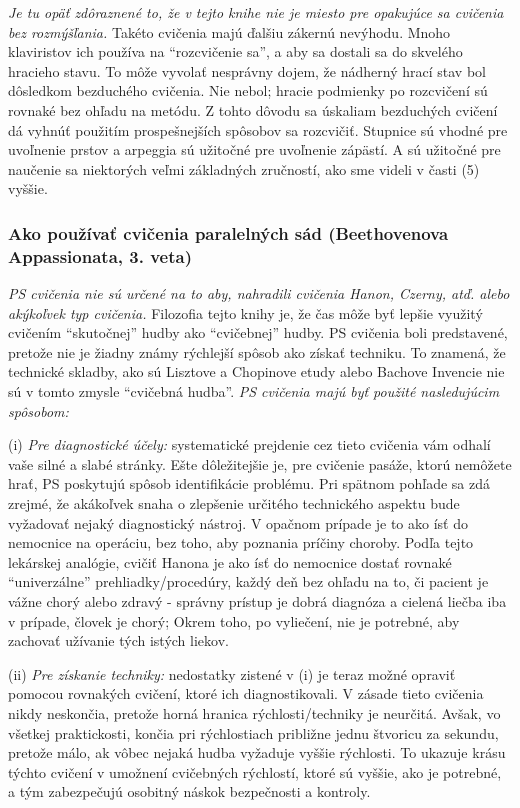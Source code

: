 \emph{Je tu opäť zdôraznené to, že v tejto knihe nie je miesto pre opakujúce sa cvičenia bez rozmýšľania.} Takéto cvičenia majú ďalšiu zákernú nevýhodu. Mnoho klaviristov ich používa na “rozcvičenie sa”, a aby sa dostali sa do skvelého hracieho stavu. To môže vyvolať nesprávny dojem, že nádherný hrací stav bol dôsledkom bezduchého cvičenia. Nie nebol; hracie podmienky po rozcvičení sú  rovnaké bez ohľadu na metódu. Z tohto dôvodu sa úskaliam bezduchých cvičení dá vyhnúť použitím prospešnejších spôsobov sa rozcvičiť. Stupnice sú vhodné pre uvoľnenie prstov a arpeggia sú užitočné pre uvoľnenie zápästí. A sú užitočné pre naučenie sa niektorých veľmi základných zručností, ako sme videli v časti (5) vyššie.

\subsubsection{Ako používať cvičenia paralelných sád (Beethovenova Appassionata, 3. veta)}
\emph{PS cvičenia nie sú určené na to aby, nahradili cvičenia Hanon, Czerny, atď. alebo akýkoľvek typ cvičenia.} Filozofia tejto knihy je, že čas môže byť lepšie využitý cvičením “skutočnej” hudby ako “cvičebnej” hudby. PS cvičenia boli predstavené, pretože nie je žiadny známy rýchlejší spôsob ako získať techniku. To znamená, že technické skladby, ako sú Lisztove a Chopinove etudy alebo Bachove Invencie nie sú v tomto zmysle “cvičebná hudba”. \emph{PS cvičenia majú byť použité nasledujúcim spôsobom:}

(i) \emph{Pre diagnostické účely:} systematické prejdenie cez tieto cvičenia vám odhalí vaše silné a slabé stránky. Ešte dôležitejšie je, pre cvičenie pasáže, ktorú nemôžete hrať, PS poskytujú spôsob identifikácie problému. Pri spätnom pohľade sa zdá zrejmé, že akákoľvek snaha o zlepšenie určitého technického aspektu bude vyžadovať nejaký diagnostický nástroj. V opačnom prípade je to ako ísť do nemocnice na operáciu, bez toho, aby poznania príčiny choroby. Podľa tejto lekárskej analógie, cvičiť Hanona je ako ísť do nemocnice dostať rovnaké “univerzálne” prehliadky/procedúry, každý deň bez ohľadu na to, či pacient je vážne chorý alebo zdravý - správny prístup je dobrá diagnóza a cielená liečba iba v prípade, človek je chorý; Okrem toho, po vyliečení, nie je potrebné, aby zachovať užívanie tých istých liekov.

(ii) \emph{Pre získanie techniky:} nedostatky zistené v (i) je teraz možné opraviť pomocou rovnakých cvičení, ktoré ich diagnostikovali. V zásade tieto cvičenia nikdy neskončia, pretože horná hranica rýchlosti/techniky je neurčitá. Avšak, vo všetkej praktickosti, končia pri rýchlostiach približne jednu štvoricu za sekundu, pretože málo, ak vôbec nejaká hudba vyžaduje vyššie rýchlosti. To ukazuje krásu týchto cvičení v umožnení cvičebných rýchlostí, ktoré sú vyššie, ako je potrebné, a tým zabezpečujú osobitný náskok bezpečnosti a kontroly.

